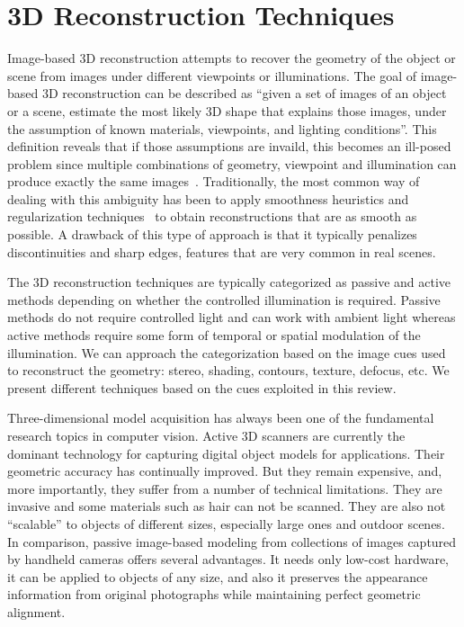 \section{3D Reconstruction Techniques}
\label{sec:3DReconTech}

Image-based 3D reconstruction attempts to recover the geometry of the object or scene from images under different viewpoints or illuminations. The goal of image-based 3D reconstruction can be described as ``given a set of images of an object or a scene, estimate the most likely 3D shape that explains those images, under the assumption of known materials, viewpoints, and lighting conditions''. This definition reveals that if those assumptions are invaild, this becomes an ill-posed problem since multiple combinations of geometry, viewpoint and illumination can produce exactly the same images~\cite{poggio1985computational}. Traditionally, the most common way of dealing with this ambiguity has been to apply smoothness heuristics and regularization techniques~\cite{poggio1985computational} to obtain reconstructions that are as smooth as possible. A drawback of this type of approach is that it typically penalizes discontinuities and sharp edges, features that are very common in real scenes.

The 3D reconstruction techniques are typically categorized as passive and active methods depending on whether the controlled illumination is required. Passive methods do not require controlled light and can work with ambient light whereas active methods require some form of temporal or spatial modulation of the illumination. We can approach the categorization based on the image cues used to reconstruct the geometry: stereo, shading, contours, texture, defocus, etc. We present different techniques based on the cues exploited in this review.

Three-dimensional model acquisition has always been one of the fundamental research topics in computer vision. Active 3D scanners are currently the dominant technology for capturing digital object models for applications. Their geometric accuracy has continually improved. But they remain expensive, and, more importantly, they suffer from a number of technical limitations. They are invasive and some materials such as hair can not be scanned. They are also not ``scalable'' to objects of different sizes, especially large ones and outdoor scenes. In comparison, passive image-based modeling from collections of images captured by handheld cameras offers several advantages. It needs only low-cost hardware, it can be applied to objects of any size, and also it preserves the appearance information from original photographs while maintaining perfect geometric alignment.

